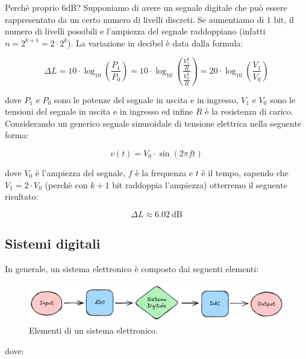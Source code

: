 \documentclass[a4paper,12pt]{report}  %
\begin{document}
Perchè proprio $6 \text{dB}$? Supponiamo di avere un segnale digitale che può essere rappresentato da un certo numero di livelli discreti.
Se aumentiamo di $1$ bit, il numero di livelli possibili e l'ampiezza del segnale raddoppiano (infatti $n = 2^{k + 1} = 2 \cdot 2^k$).
La variazione in decibel è data dalla formula:

\begin{equation}
    \Delta L = 10 \cdot \log_{10} \left( \frac{P_1}{P_0} \right) = 10 \cdot \log_{10} \left( \frac{\frac{V_1^2}{R}}{\frac{V_0^2}{R}} \right) = 20 \cdot \log_{10} \left( \frac{V_1}{V_0} \right) \nonumber
\end{equation}

dove $P_1$ e $P_0$ sono le potenze del segnale in uscita e in ingresso, $V_1$ e $V_0$ sono le tensioni del segnale in uscita e in ingresso ed infine $R$ è la resistenza di carico.
Considerando un generico segnale sinusoidale di tensione elettrica nella seguente forma:

\begin{equation}
    v(t) = V_0 \cdot \sin(2 \pi f t) \nonumber
\end{equation}

dove $V_0$ è l'ampiezza del segnale, $f$ è la frequenza e $t$ è il tempo, sapendo che $V_1 = 2 \cdot V_0$ (perchè con $k + 1$ bit raddoppia l'ampiezza) otterremo il seguente risultato:

\begin{equation}
    \Delta L \approx 6.02 \ \text{dB} \nonumber
\end{equation}

\subsection{Sistemi digitali}
In generale, un sistema elettronico è composto dai seguenti elementi:

\begin{figure}[h]
    \centering
    \includegraphics[width=1.0\textwidth]{imgs/electronics-system-elements.png}
    \caption{Elementi di un sistema elettronico.}
    \label{fig:system}
\end{figure}

dove:
\end{document}
